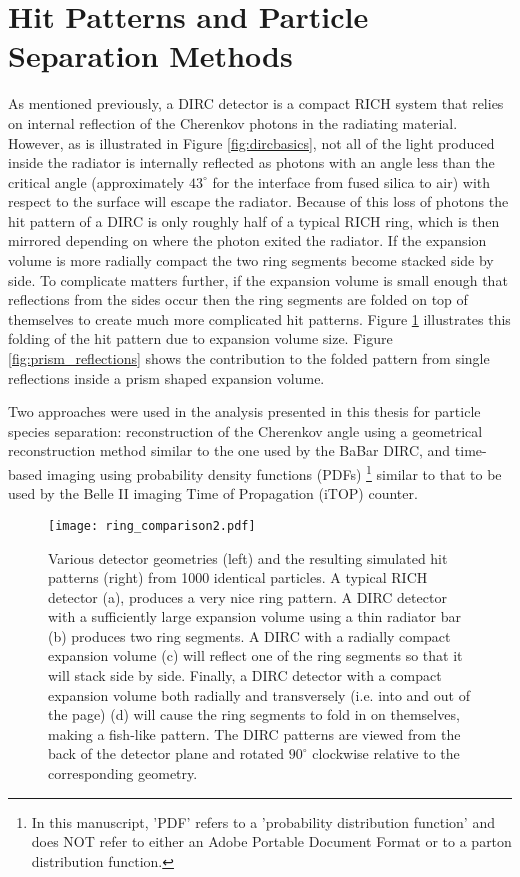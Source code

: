 \section{Hit Patterns and Particle Separation Methods}
As mentioned previously, a DIRC detector is a compact RICH system that relies on internal reflection of the Cherenkov photons in the radiating material. However, as is illustrated in Figure \ref{fig:dircbasics}, not all of the light produced inside the radiator is internally reflected as photons with an angle less than the critical angle (approximately $43^{\circ}$ for the interface from fused silica to air) with respect to the surface will escape the radiator. Because of this loss of photons the hit pattern of a DIRC is only roughly half of a typical RICH ring, which is then mirrored depending on where the photon exited the radiator. If the expansion volume is more radially compact the two ring segments become stacked side by side. To complicate matters further, if the expansion volume is small enough that reflections from the sides occur then the ring segments are folded on top of themselves to create much more complicated hit patterns. Figure \ref{fig:ring_comparison2} illustrates this folding of the hit pattern due to expansion volume size. Figure \ref{fig:prism_reflections} shows the contribution to the folded pattern from single reflections inside a prism shaped expansion volume.

Two approaches were used in the analysis presented in this thesis for particle species separation: reconstruction of the Cherenkov angle using a geometrical reconstruction method similar to the one used by the BaBar DIRC, and time-based imaging using probability density functions (PDFs) \footnote{In this manuscript, 'PDF' refers to a 'probability distribution function' and does NOT refer to either an Adobe\textsuperscript{\textregistered} Portable Document Format or to a parton distribution function.} similar to that to be used by the Belle II imaging Time of Propagation (iTOP) counter.

\begin{figure}[H]
	\centering
	\texttt{[image: ring\_comparison2.pdf]}
	\caption{Various detector geometries (left) and the resulting simulated hit patterns (right) from 1000 identical particles. A typical RICH detector (a), produces a very nice ring pattern. A DIRC detector with a sufficiently large expansion volume using a thin radiator bar (b) produces two ring segments. A DIRC with a radially compact expansion volume (c) will reflect one of the ring segments so that it will stack side by side. Finally, a DIRC detector with a compact expansion volume both radially and transversely (i.e. into and out of the page) (d) will cause the ring segments to fold in on themselves, making a fish-like pattern. The DIRC patterns are viewed from the back of the detector plane and rotated $90^{\circ}$ clockwise relative to the corresponding geometry.}
	\label{fig:ring_comparison2}
\end{figure}



